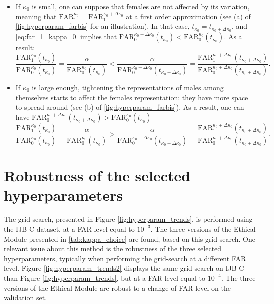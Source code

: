 \documentclass[nohyperref]{article}
\theoremstyle{plain}
\theoremstyle{definition}
\theoremstyle{remark}
\begin{document}
\begin{itemize}
    \item If $\kappa_0$ is small, one can suppose that females are not affected by its variation, meaning that $\mathrm{FAR}_1^{\kappa_0} = \mathrm{FAR}_1^{\kappa_0 + \Delta \kappa_0}$ at a first order approximation (see (a) of \autoref{fig:hyperparam_farbis} for an illustration). In that case, $t_{\kappa_0} = t_{\kappa_0 + \Delta \kappa_0}$, and \autoref{eq:far_1_kappa_0} implies that $\mathrm{FAR}^{\kappa_0 + \Delta \kappa_0}_0(t_{\kappa_0}) < \mathrm{FAR}^{\kappa_0}_0(t_{\kappa_0}) $. As a result:
    \[ \frac{\mathrm{FAR}^{\kappa_0}_1(t_{\kappa_0})}{\mathrm{FAR}^{\kappa_0}_0(t_{\kappa_0})} = \frac{\alpha}{\mathrm{FAR}^{\kappa_0}_0(t_{\kappa_0})} < \frac{\alpha}{\mathrm{FAR}_0^{\kappa_0 + \Delta \kappa_0}(t_{\kappa_0 + \Delta \kappa_0})} = \frac{\mathrm{FAR}^{\kappa_0 + \Delta \kappa_0}_1(t_{\kappa_0 + \Delta \kappa_0})}{\mathrm{FAR}^{\kappa_0 + \Delta \kappa_0}_0(t_{\kappa_0 + \Delta \kappa_0})}.  \] 
    
    \item If $\kappa_0$ is large enough, tightening the representations of males among themselves starts to affect the females representation: they have more space to spread around (see (b) of \autoref{fig:hyperparam_farbis}). As a result, one can have $\mathrm{FAR}^{\kappa_0 + \Delta \kappa_0}_0(t_{\kappa_0 + \Delta \kappa_0}) > \mathrm{FAR}^{\kappa_0}_0(t_{\kappa_0}) $
    \[ \frac{\mathrm{FAR}^{\kappa_0}_1(t_{\kappa_0})}{\mathrm{FAR}^{\kappa_0}_0(t_{\kappa_0})} = \frac{\alpha}{\mathrm{FAR}^{\kappa_0}_0(t_{\kappa_0})} > \frac{\alpha}{\mathrm{FAR}_0^{\kappa_0 + \Delta \kappa_0}(t_{\kappa_0 + \Delta \kappa_0})} = \frac{\mathrm{FAR}^{\kappa_0 + \Delta \kappa_0}_1(t_{\kappa_0 + \Delta \kappa_0})}{\mathrm{FAR}^{\kappa_0 + \Delta \kappa_0}_0(t_{\kappa_0 + \Delta \kappa_0})}.  \] 
\end{itemize}


\section{Robustness of the selected hyperparameters}\label{app:robustness_kappas}

The grid-search, presented in Figure \ref{fig:hyperparam_trends}, is performed using the IJB-C dataset, at a FAR level equal to $10^{-3}$.  The three versions of the Ethical Module presented in \autoref{tab:kappa_choice} are found, based on this grid-search. One relevant issue about this method is the robustness of the three selected hyperparameters, typically when performing the grid-search at a different FAR level. Figure \ref{fig:hyperparam_trends2} displays the same grid-search on IJB-C than Figure \ref{fig:hyperparam_trends}, but at a FAR level equal to $10^{-4}$. The three versions of the Ethical Module are robust to a change of FAR level on the validation set.
\end{document}
